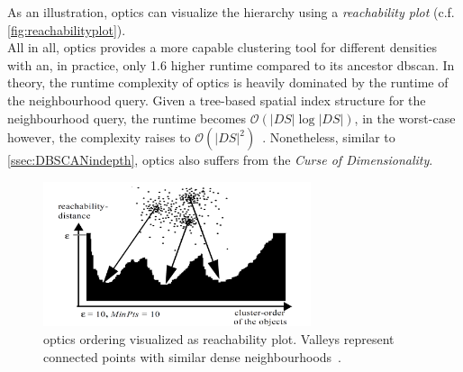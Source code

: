 As an illustration, \gls{optics} can visualize the hierarchy using a \textit{reachability plot} (c.f. \autoref{fig:reachabilityplot}).\\

All in all, \gls{optics} provides a more capable clustering tool for different densities with an, in practice, only 1.6 higher runtime compared to its ancestor \gls{dbscan}. In theory, the runtime complexity of \gls{optics} is heavily dominated by the runtime of the neighbourhood query. Given a tree-based spatial index structure for the neighbourhood query, the runtime becomes $\mathcal{O}(|DS| \log |DS|)$, in the worst-case however, the complexity raises to $\mathcal{O}(|DS|^2)$~\cite{opticsankerst1999optics}. Nonetheless, similar to \autoref{ssec:DBSCANindepth}, \gls{optics} also suffers from the \textit{Curse of Dimensionality}.

\begin{figure}
    \centering
    \includegraphics[width=0.7\textwidth]{figures/reachabilityplot.png}
    \caption{\acrshort{optics} ordering visualized as reachability plot. Valleys represent connected points with similar dense neighbourhoods~\cite{opticsankerst1999optics}.}
    \label{fig:reachabilityplot}
\end{figure}

